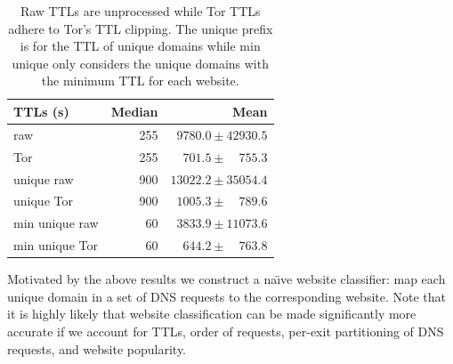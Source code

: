 \begin{table}[t]
	\caption{Raw TTLs are unprocessed while Tor TTLs adhere to Tor's TTL clipping.
	The unique prefix is for the TTL of unique domains while min unique only
	considers the unique domains with the minimum TTL for each website.}
	\centering
	\begin{tabular}{l r r}
	\toprule
	\textbf{TTLs (s)} & \textbf{Median} & \textbf{Mean} \\
	\midrule
	raw & 255 & $9780.0\pm42930.5$ \\ %
	Tor & 255 & $701.5\pm\phantom{00}755.3$ \\ %
	unique raw & 900 & $13022.2\pm35054.4$ \\ %
	unique Tor & 900 & $1005.3\pm\phantom{00}789.6$ \\ %
	min unique raw & 60 & $3833.9\pm11073.6$ \\ %
	min unique Tor & 60 & $644.2\pm\phantom{00}763.8$ \\ %
	\bottomrule
	\end{tabular}
	\label{tab:ttls}
\end{table}


Motivated by the above results we construct a na\"{\i}ve website classifier:
map each unique domain in a set of DNS requests to the corresponding website.
Note that it is highly likely that website classification can be made
significantly more accurate if we account for TTLs, order of requests, per-exit
partitioning of DNS requests, and website popularity.

